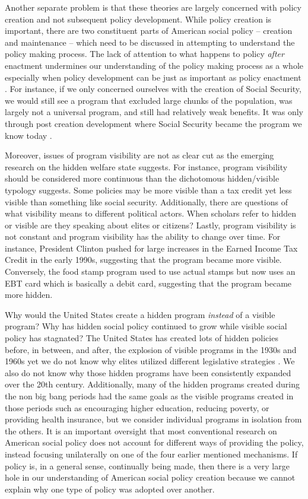 \documentclass[12pt]{article}
\begin{document}
Another separate problem is that these theories are largely concerned with policy creation and not subsequent policy development. While policy creation is important, there are two constituent parts of American social policy -- creation and maintenance -- which need to be discussed in attempting to understand the policy making process. The lack of attention to what happens to policy \emph{after} enactment undermines our understanding of the policy making process as a whole especially when policy development can be just as important as policy enactment \citep{patashnik2008}. For instance, if we only concerned ourselves with the creation of Social Security, we would still see a program that excluded large chunks of the population, was largely not a universal program, and still had relatively weak benefits. It was only through post creation development where Social Security became the program we know today \citep{derthick1979}. 

Moreover, issues of program visibility are not as clear cut as the emerging research on the hidden welfare state suggests. For instance, program visibility should be considered more continuous than the dichotomous hidden/visible typology suggests. Some policies may be more visible than a tax credit yet less visible than something like social security. Additionally, there are questions of what visibility means to different political actors. When scholars refer to hidden or visible are they speaking about elites or citizens? Lastly, program visibility is not constant and program visibility has the ability to change over time. For instance, President Clinton pushed for large increases in the Earned Income Tax Credit in the early 1990s, suggesting that the program became more visible. Conversely, the food stamp program used to use actual stamps but now uses an EBT card which is basically a debit card, suggesting that the program became more hidden. 

Why would the United States create a hidden program \emph{instead} of a visible program? Why has hidden social policy continued to grow while visible social policy has stagnated? The United States has created lots of hidden policies before, in between, and after, the explosion of visible programs in the 1930s and 1960s yet we do not know why elites utilized different legislative strategies \citep[Ch. 2]{howard2008}. We also do not know why those hidden programs have been consistently expanded over the 20th century. Additionally, many of the hidden programs created during the non big bang periods had the same goals as the visible programs created in those periods such as encouraging higher education, reducing poverty, or providing health insurance, but we consider individual programs in isolation from the others. It is an important oversight that most conventional research on American social policy does not account for different ways of providing the policy, instead focusing unilaterally on one of the four earlier mentioned mechanisms. If policy is, in a general sense, continually being made, then there is a very large hole in our understanding of American social policy creation because we cannot explain why one type of policy was adopted over another.
\end{document}
